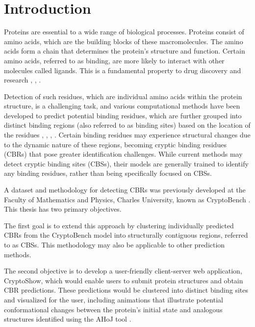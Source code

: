 \chapter*{Introduction}

Proteins are essential to a wide range of biological processes. Proteins consist of amino acids, which are the building blocks of these macromolecules. The amino acids form a chain that determines the protein's structure and function. Certain amino acids, referred to as binding, are more likely to interact with other molecules called ligands. This is a fundamental property to drug discovery and research \cite{trainor2007importance}, \cite{ballante2021protein}, \cite{mannhold2006protein}.

Detection of such residues, which are individual amino acids within the protein structure, is a challenging task, and various computational methods have been developed to predict potential binding residues, which are further grouped into distinct binding regions (also referred to as binding sites) based on the location of the residues \cite{krivak2018p2rank}, \cite{le2009fpocket}, \cite{aggarwal2021deeppocket}, \cite{smith2024graph}. Certain binding residues may experience structural changes due to the dynamic nature of these regions, becoming cryptic binding residues (CBRs) that pose greater identification challenges. While current methods may detect cryptic binding sites (CBSs), their models are generally trained to identify any binding residues, rather than being specifically focused on CBSs.

A dataset and methodology for detecting CBRs was previously developed at the Faculty of Mathematics and Physics, Charles University, known as CryptoBench \cite{vskrhak2025cryptobench}. This thesis has two primary objectives. 

The first goal is to extend this approach by clustering individually predicted CBRs from the CryptoBench model into structurally contiguous regions, referred to as CBSs. This methodology may also be applicable to other prediction methods.

The second objective is to develop a user-friendly client-server web application, CryptoShow, which would enable users to submit protein structures and obtain CBR predictions. These predictions would be clustered into distinct binding sites and visualized for the user, including animations that illustrate potential conformational changes between the protein's initial state and analogous structures identified using the AHoJ tool \cite{feidakis2022ahoj}.

